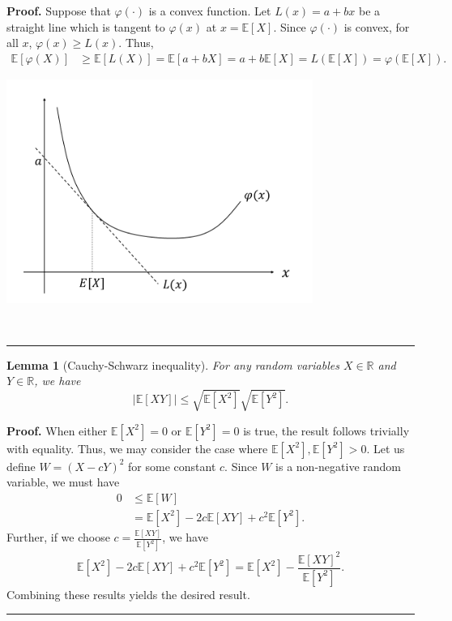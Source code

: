 \documentclass[10.5pt, A4paper, openany, uplatex]{book}
\newcommand{\mbb}{\mathbb}
\newcommand{\E}{\mathbb{E}}
\newtheorem{lemma}[theorem]{Lemma}
\newenvironment{proof}[1][Proof]{\textbf{#1.} }{\  \rule{0.5em}{0.5em}}
\numberwithin{equation}{section}
\begin{document}
\begin{appendices}
	\begin{proof}
		Suppose that $\varphi(\cdot)$ is a convex function.
		Let $L(x) = a + bx$ be a straight line which is tangent to $\varphi(x)$ at $x = \E[X]$.
		Since $\varphi(\cdot)$ is convex, for all $x$, $\varphi(x) \ge L(x)$.
		Thus,
		\begin{align*}
		\E[\varphi(X)] 
		& \ge \E[L(X)] = \E[a + bX] = a + b \E[X] = L(\E[X]) =  \varphi(\E[X]).
		\end{align*}
		\begin{center}
			\includegraphics[width = 10cm]{jensen.png}
		\end{center}
	
	\end{proof}
	
	\begin{lemma}[Cauchy-Schwarz inequality]\label{lem:CS}
		For any random variables $X \in \mbb{R}$ and $Y \in \mbb{R}$, we have
		\[
		\left| \E[XY] \right| \le \sqrt{\E[X^2]} \sqrt{\E[Y^2]}. 
		\]
	\end{lemma}
	
	\begin{proof}
		When either $\E[X^2] = 0$ or $\E[Y^2] = 0$ is true, the result follows trivially with equality.
		Thus, we may consider the case where $\E[X^2], \E[Y^2] > 0$.
		Let us define $W = (X - c Y)^2$ for some constant $c$.
		Since $W$ is a non-negative random variable, we must have
		\begin{align*}
			0 
			& \le \E[W] \\
			& = \E[X^2] - 2c\E[XY] + c^2 \E[Y^2].
		\end{align*}
		Further, if we choose $c = \frac{\E[XY]}{\E[Y^2]}$, we have
		\[
			 \E[X^2] - 2c\E[XY] + c^2 \E[Y^2] = \E[X^2] - \frac{\E[XY]^2}{\E[Y^2]}.
		\]
		Combining these results yields the desired result.
	\end{proof}

\end{appendices}
\end{document}
